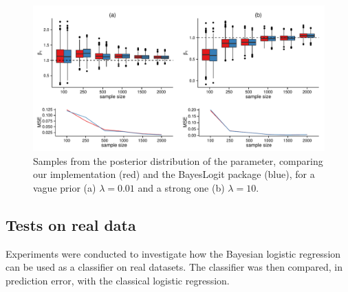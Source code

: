 \documentclass[a4paper]{article}\usepackage[]{graphicx}\usepackage[]{color}
\begin{document}
\begin{figure}[ht]
\centering
\includegraphics[width=\textwidth]{posterior_and_mse}
\caption{Samples from the posterior distribution of the parameter, comparing our implementation (red) and the BayesLogit package (blue), for a vague prior (a) $\lambda=0.01$ and a strong one (b) $\lambda=10$.}
\label{fig:posterior_and_mse}
\end{figure}


\subsection{Tests on real data}

Experiments were conducted to investigate how the Bayesian logistic regression can be used as a classifier on real datasets. The classifier was then compared, in prediction error, with the classical logistic regression.
\end{document}
